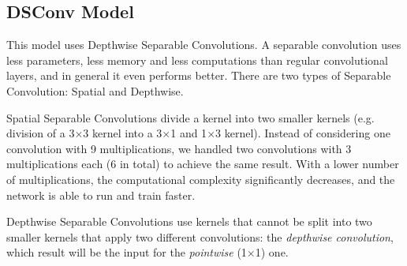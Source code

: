 \documentclass[conference]{IEEEtran}
\begin{document}
\subsection{DSConv Model}
This model uses Depthwise Separable Convolutions. A separable convolution uses less parameters, less memory and less computations than regular convolutional layers, and in general it even performs better.
There are two types of Separable Convolution: Spatial and Depthwise.

Spatial Separable Convolutions divide a kernel into two smaller kernels (e.g. division of a 3$\times$3 kernel into a 3$\times$1 and 1$\times$3 kernel). Instead of considering one convolution with 9 multiplications, we handled two convolutions with 3 multiplications each (6 in total) to achieve the same result. With a lower number of multiplications, the computational complexity significantly decreases, and the network is able to run and train faster.

Depthwise Separable Convolutions use kernels that cannot be split into two smaller kernels that apply two different convolutions: the \textit{depthwise convolution}, which result will be the input for the \textit{pointwise} (1$\times$1) one.
\end{document}
